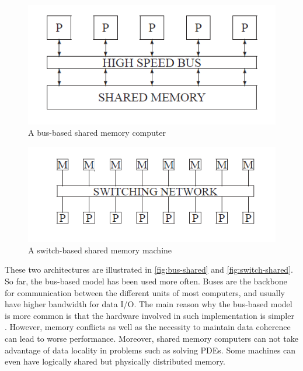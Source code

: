 \begin{figure}[h!]
    \centering
    \includegraphics[width=\linewidth]{figures/bus-based-shared-memory.png}
    \caption{A bus-based shared memory computer \cite{saad2003iterative}}
    \label{fig:bus-shared}
\end{figure}

\begin{figure}[h!]
    \centering
    \includegraphics[width=\linewidth]{figures/switch-based-shared-memory.png}
    \caption{A switch-based shared memory machine \cite{saad2003iterative}}
    \label{fig:switch-shared}
\end{figure}

These two architectures are illustrated in \autoref{fig:bus-shared} and \autoref{fig:switch-shared}. So far, the bus-based model has been used more often. Buses are the backbone for communication between the different units of most computers, and usually have higher bandwidth for data I/O. The main reason why the bus-based model is more common is that the hardware involved in such implementation is simpler \cite{adeli1987parallel}. However, memory conflicts as well as the necessity to maintain data coherence can lead to worse performance. Moreover, shared memory computers can not take advantage of data locality in problems such as solving PDEs. Some machines can even have logically shared but physically distributed memory.

